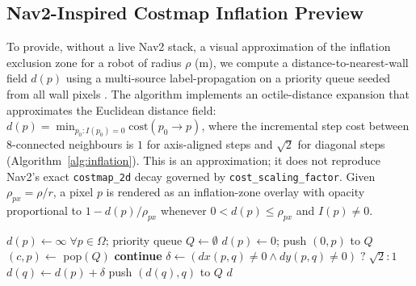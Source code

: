 \documentclass[journal]{IEEEtran}
\begin{document}
\subsection{Nav2-Inspired Costmap Inflation Preview}
To provide, without a live Nav2 stack, a visual approximation of the inflation exclusion zone for a robot of radius $\rho$ (m), we compute a distance-to-nearest-wall field $d(p)$ using a multi-source label-propagation on a priority queue seeded from all wall pixels \cite{borgefors1986distance}. The algorithm implements an octile-distance expansion that approximates the Euclidean distance field: $d(p) = \min_{p_0 : I(p_0)=0} \mathrm{cost}(p_0 \rightarrow p)$, where the incremental step cost between 8-connected neighbours is $1$ for axis-aligned steps and $\sqrt{2}$ for diagonal steps (Algorithm~\ref{alg:inflation}). This is an approximation; it does not reproduce Nav2's exact \texttt{costmap\_2d} decay governed by \texttt{cost\_scaling\_factor}. Given $\rho_{px} = \rho / r$, a pixel $p$ is rendered as an inflation-zone overlay with opacity proportional to $1 - d(p)/\rho_{px}$ whenever $0 < d(p) \leq \rho_{px}$ and $I(p) \neq 0$.

\begin{algorithm}[t]
\small
\caption{Multi-source octile distance transform for inflation}
\label{alg:inflation}
\begin{algorithmic}[1]
\State $d(p) \gets \infty \; \forall p \in \Omega$; priority queue $Q \gets \emptyset$ 
 \State $d(p)\gets 0$; push $(0, p)$ to $Q$ \EndFor
{}
  \State $(c, p) \gets $ pop$(Q)$ 
   \textbf{continue} \EndIf {}
     \State $\delta \gets (dx(p,q)\neq 0 \wedge dy(p,q) \neq 0) \; ? \; \sqrt{2} : 1$
        \State $d(q) \gets d(p) + \delta$
         push $(d(q), q)$ to $Q$ \EndIf
     \EndIf
  \EndFor
\EndWhile
\State \Return $d$
\end{algorithmic}
\end{algorithm}
\vspace{-2mm}
\end{document}
